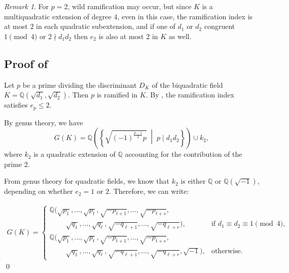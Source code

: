 \documentclass[12 pt]{amsart}
\theoremstyle{definition}
\theoremstyle{remark}
\newtheorem{remark}{Remark}
\begin{document}
\begin{remark}
    	For $p = 2$, wild ramification may occur, but since $K$ is a multiquadratic extension of degree $4$, even in this case, the ramification index is at most $2$ in each quadratic subextension, and if one of $d_1$ or $d_2$ congruent $1\pmod{4}$  or  $2 \nmid d_1d_2$ then  $e_2$ is also at most $2$ in $K$ as well.
		
\end{remark}
\subsection*{ Proof of }

		
Let $p$ be a prime dividing the discriminant $D_K$ of the biquadratic field $K = \mathbb{Q}(\sqrt{d_1}, \sqrt{d_2})$. Then $p$ is ramified in $K$. By , the ramification index satisfies $e_p \leq 2$. 

By genus theory, we have
\[
G(K) = \mathbb{Q}\left( \left\{ \sqrt{(-1)^{\frac{p-1}{2}}p} \;\middle|\; p \mid d_1d_2 \right\} \right)\cup k_2 ,
\]
where $k_2$ is a quadratic extension of $\mathbb{Q}$ accounting for the contribution of the prime $2$.

From genus theory for quadratic fields, we know that $k_2$ is either $\mathbb{Q}$ or $\mathbb{Q}(\sqrt{-1})$, depending on whether $e_2 = 1$ or $2$. Therefore, we can write:

\begin{align*}
G(K) =
\begin{cases}
\mathbb{Q}\big( \sqrt{p_1}, \dots, \sqrt{p_t}, \sqrt{-p_{t+1}}, \dots, \sqrt{-p_{t+s}}, \\
\qquad\; \sqrt{q_1}, \dots, \sqrt{q_\ell}, \sqrt{-q_{\ell+1}}, \dots, \sqrt{-q_{\ell+r}} \big), & \text{if } d_1 \equiv d_2 \equiv 1 \pmod{4}, \\[1ex]
\mathbb{Q}\big( \sqrt{p_1}, \dots, \sqrt{p_t}, \sqrt{-p_{t+1}}, \dots, \sqrt{-p_{t+s}}, \\
\qquad\; \sqrt{q_1}, \dots, \sqrt{q_\ell}, \sqrt{-q_{\ell+1}}, \dots, \sqrt{-q_{\ell+r}}, \sqrt{-1} \big), & \text{otherwise}.
\end{cases}
\end{align*}
\qed
\end{document}
